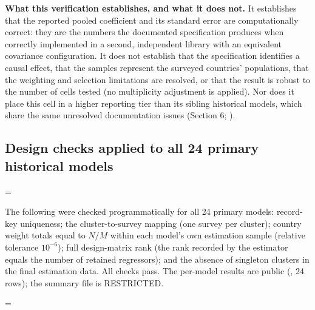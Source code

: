 \textbf{What this verification establishes, and what it does not.} It establishes that the reported pooled coefficient and its standard error are computationally correct: they are the numbers the documented specification produces when correctly implemented in a second, independent library with an equivalent covariance configuration. It does not establish that the specification identifies a causal effect, that the samples represent the surveyed countries' populations, that the weighting and selection limitations are resolved, or that the result is robust to the number of cells tested (no multiplicity adjustment is applied). Nor does it place this cell in a higher reporting tier than its sibling historical models, which share the same unresolved documentation issues (Section 6; ).

\subsection{Design checks applied to all 24 primary historical models}\label{sec:B.3}

\begingroup\edef\ThesisSavedIndent{\the\parindent}\raggedright\parindent=\ThesisSavedIndent\relax{}

The following were checked programmatically for all 24 primary models: record-key uniqueness; the cluster-to-survey mapping (one survey per cluster); country weight totals equal to \(N/M\) within each model's own estimation sample (relative tolerance \(10^{-6}\)); full design-matrix rank (the rank recorded by the estimator equals the number of retained regressors); and the absence of singleton clusters in the final estimation data. All checks pass. The per-model results are public (, 24 rows); the summary file is RESTRICTED.

\par\endgroup

\begingroup\edef\ThesisSavedIndent{\the\parindent}\raggedright\parindent=\ThesisSavedIndent\relax{}

